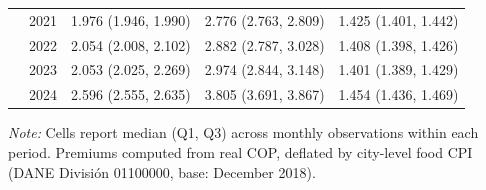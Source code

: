 \begin{table}[htbp]
\begin{tabular}{llrrr}
 & 2021 & 1.976 (1.946, 1.990) & 2.776 (2.763, 2.809) & 1.425 (1.401, 1.442) \\
 & 2022 & 2.054 (2.008, 2.102) & 2.882 (2.787, 3.028) & 1.408 (1.398, 1.426) \\
 & 2023 & 2.053 (2.025, 2.269) & 2.974 (2.844, 3.148) & 1.401 (1.389, 1.429) \\
 & 2024 & 2.596 (2.555, 2.635) & 3.805 (3.691, 3.867) & 1.454 (1.436, 1.469) \\
\bottomrule
\end{tabular}
\begin{minipage}{\linewidth}
\vspace{2pt}\footnotesize
\textit{Note:} Cells report median (Q1, Q3) across monthly observations within each period. Premiums computed from real COP, deflated by city-level food CPI (DANE Divisi\'{o}n 01100000, base: December 2018).
\end{minipage}
\end{table}
